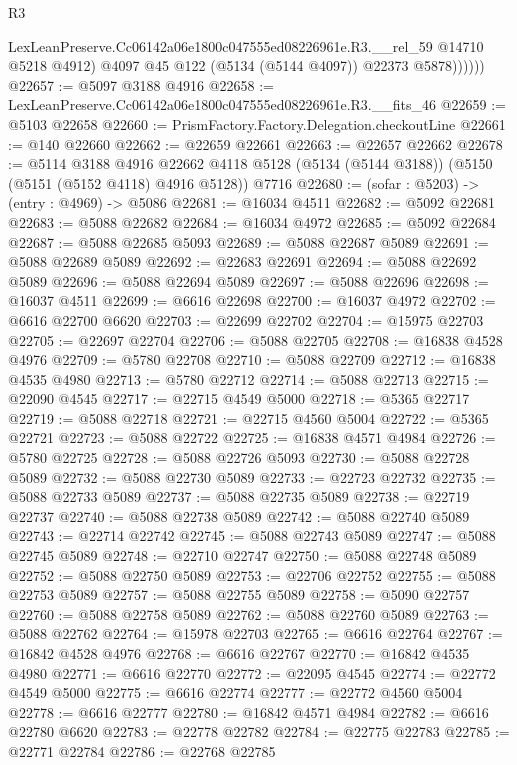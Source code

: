 \begin{lexlean}{R3}
\begin{coremodule}
                LexLeanPreserve.Cc06142a06e1800c047555ed08226961e.R3.__rel_59 @14710 @5218 @4912)
                @4097
                @45
                @122
                (@5134 (@5144 @4097))
                @22373
                @5878))))))
@22657 := @5097 @3188 @4916
@22658 := LexLeanPreserve.Cc06142a06e1800c047555ed08226961e.R3.__fits_46
@22659 := @5103 @22658
@22660 := PrismFactory.Factory.Delegation.checkoutLine
@22661 := @140 @22660
@22662 := @22659 @22661
@22663 := @22657 @22662
@22678 := @5114
    @3188
    @4916
    @22662
    @4118
    @5128
    (@5134 (@5144 @3188))
    (@5150 (@5151 (@5152 @4118) @4916 @5128))
    @7716
@22680 := (sofar : @5203) -> (entry : @4969) -> @5086
@22681 := @16034 @4511
@22682 := @5092 @22681
@22683 := @5088 @22682
@22684 := @16034 @4972
@22685 := @5092 @22684
@22687 := @5088 @22685 @5093
@22689 := @5088 @22687 @5089
@22691 := @5088 @22689 @5089
@22692 := @22683 @22691
@22694 := @5088 @22692 @5089
@22696 := @5088 @22694 @5089
@22697 := @5088 @22696
@22698 := @16037 @4511
@22699 := @6616 @22698
@22700 := @16037 @4972
@22702 := @6616 @22700 @6620
@22703 := @22699 @22702
@22704 := @15975 @22703
@22705 := @22697 @22704
@22706 := @5088 @22705
@22708 := @16838 @4528 @4976
@22709 := @5780 @22708
@22710 := @5088 @22709
@22712 := @16838 @4535 @4980
@22713 := @5780 @22712
@22714 := @5088 @22713
@22715 := @22090 @4545
@22717 := @22715 @4549 @5000
@22718 := @5365 @22717
@22719 := @5088 @22718
@22721 := @22715 @4560 @5004
@22722 := @5365 @22721
@22723 := @5088 @22722
@22725 := @16838 @4571 @4984
@22726 := @5780 @22725
@22728 := @5088 @22726 @5093
@22730 := @5088 @22728 @5089
@22732 := @5088 @22730 @5089
@22733 := @22723 @22732
@22735 := @5088 @22733 @5089
@22737 := @5088 @22735 @5089
@22738 := @22719 @22737
@22740 := @5088 @22738 @5089
@22742 := @5088 @22740 @5089
@22743 := @22714 @22742
@22745 := @5088 @22743 @5089
@22747 := @5088 @22745 @5089
@22748 := @22710 @22747
@22750 := @5088 @22748 @5089
@22752 := @5088 @22750 @5089
@22753 := @22706 @22752
@22755 := @5088 @22753 @5089
@22757 := @5088 @22755 @5089
@22758 := @5090 @22757
@22760 := @5088 @22758 @5089
@22762 := @5088 @22760 @5089
@22763 := @5088 @22762
@22764 := @15978 @22703
@22765 := @6616 @22764
@22767 := @16842 @4528 @4976
@22768 := @6616 @22767
@22770 := @16842 @4535 @4980
@22771 := @6616 @22770
@22772 := @22095 @4545
@22774 := @22772 @4549 @5000
@22775 := @6616 @22774
@22777 := @22772 @4560 @5004
@22778 := @6616 @22777
@22780 := @16842 @4571 @4984
@22782 := @6616 @22780 @6620
@22783 := @22778 @22782
@22784 := @22775 @22783
@22785 := @22771 @22784
@22786 := @22768 @22785

\end{coremodule}
\end{lexlean}
